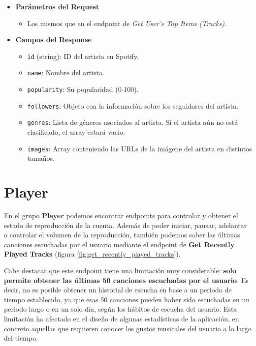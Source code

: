\begin{itemize}
    \item \textbf{Parámetros del Request}
          \begin{itemize}
              \item Los mismos que en el endpoint de \textit{Get User's Top Items (Tracks)}.
          \end{itemize}

    \item \textbf{Campos del Response}
          \begin{itemize}
              \item \texttt{id} (string): ID del artista en Spotify.
              \item \texttt{name}: Nombre del artista.
              \item \texttt{popularity}: Su popularidad (0-100).
              \item \texttt{followers}: Objeto con la información sobre los seguidores del artista.
              \item \texttt{genres}: Lista de géneros asociados al artista. Si el artista aún no está clasificado, el array estará vacío.
              \item \texttt{images}: Array conteniendo las URLs de la imágene del artista en distintos tamaños.
          \end{itemize}

\end{itemize}

\section*{Player}

En el grupo \textbf{Player} podemos encontrar endpoints para controlar y obtener el estado de reproducción de la cuenta. Además de poder iniciar, pausar, adelantar o controlar el volumen de la reproducción, también podemos saber las últimas canciones escuchadas por el usuario mediante el endpoint de \textbf{Get Recently Played Tracks} (figura \ref{fig:get_recently_played_tracks}).

Cabe destacar que este endpoint tiene una limitación muy considerable: \textbf{solo permite obtener las últimas 50 canciones escuchadas por el usuario}. Es decir, no es posible obtener un historial de escucha en base a un periodo de tiempo establecido, ya que esas 50 canciones pueden haber sido escuchadas en un periodo largo o en un solo día, según los hábitos de escucha del usuario. Esta limitación ha afectado en el diseño de algunas estadísticas de la aplicación, en concreto aquellas que requieren conocer los gustos musicales del usuario a lo largo del tiempo.


